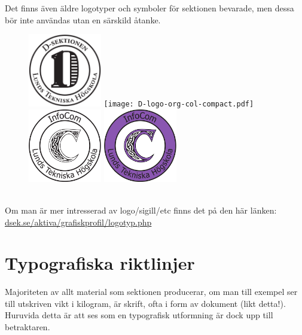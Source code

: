 \documentclass[]{dsekkallelse}
\begin{document}
Det finns även äldre logotyper och symboler för sektionen bevarade, men dessa bör inte användas utan en särskild åtanke.
\begin{figure}[!hbp]
    \centering
    \includegraphics[height=32mm]{D-logo-org-bw-compact.pdf} \texttt{[image: D-logo-org-col-compact.pdf]} \\
    \includegraphics[height=32mm]{C-logo-org-bw.pdf} \includegraphics[height=32mm]{C-logo-org-col.pdf}
    \label{fig:my_label}
\end{figure}
\\
Om man är mer intresserad av logo/sigill/etc finns det på den här länken: \\
\href{https://www.dsek.se/aktiva/grafiskprofil/logotyp.php}{dsek.se/aktiva/grafiskprofil/logotyp.php}



\section{Typografiska riktlinjer}
Majoriteten av allt material som sektionen producerar, om man till exempel ser till utskriven vikt i kilogram, är skrift, ofta i form av dokument (likt detta!). Huruvida detta är att ses som en typografisk utformning är dock upp till betraktaren.
\end{document}
